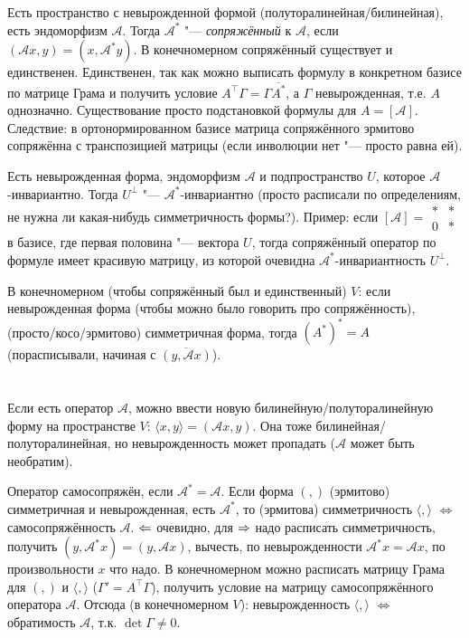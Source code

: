 \section{} %
Есть пространство с невырожденной формой (полуторалинейная/билинейная), есть эндоморфизм $\mathcal{A}$.
Тогда $\mathcal{A}^*$ "--- \textit{сопряжённый} к $\mathcal{A}$, если $(\mathcal{A}x, y) = (x, \mathcal{A}^*y)$.
В конечномерном сопряжённый существует и единственен.
Единственен, так как можно выписать формулу в конкретном базисе по матрице Грама и получить условие $A^\top \Gamma = \Gamma \overline{A^*}$,
а $\Gamma$ невырожденная, т.е. $A$ однозначно.
Существование просто подстановкой формулы для $A=[\mathcal{A}]$.
Следствие: в ортонормированном базисе матрица сопряжённого эрмитово сопряжённа с транспозицией матрицы (если инволюции нет "--- просто равна ей).

Есть невырожденная форма, эндоморфизм $\mathcal{A}$ и подпространство $U$, которое $\mathcal{A}$-инвариантно.
Тогда $U^\bot$ "--- $\mathcal{A}^*$-инвариантно (просто расписали по определениям, \TODO не нужна ли какая-нибудь симметричность формы?).
Пример: если $[\mathcal{A}] = \begin{matrix}*&*\\0&*\end{matrix}$ в базисе, где первая половина "--- вектора $U$,
тогда сопряжённый оператор по формуле имеет красивую матрицу, из которой очевидна $\mathcal{A}^*$-инвариантность $U^\bot$.

В конечномерном (чтобы сопряжённый был и единственный) $V$: если невырожденная форма (чтобы можно было говорить про сопряжённость), (просто/косо/эрмитово) симметричная форма,
тогда $(A^*)^*=A$ (порасписывали, начиная с $\overline{(y, \mathcal{A}x)}$).

\section{} %
Если есть оператор $\mathcal A$, можно ввести новую билинейную/полуторалинейную форму на пространстве $V$: $\langle x, y \rangle = (\mathcal{A}x, y)$.
Она тоже билинейная/полуторалинейная, но невырожденность может пропадать ($\mathcal A$ может быть необратим).

Оператор самосопряжён, если $\mathcal{A}^* = \mathcal{A}$.
Если форма $(,)$ (эрмитово) симметричная и невырожденная, есть $\mathcal A^*$, то (эрмитова) симметричность $\langle , \rangle$ $\iff$ самосопряжённость $\mathcal A$.
$\Leftarrow$ очевидно, для $\Rightarrow$ надо расписать симметричность, получить $(y, \mathcal A^* x) = (y, \mathcal A x)$, вычесть, по невырожденности $\mathcal A^* x = \mathcal A x$, по произвольности $x$ что надо.
В конечномерном можно расписать матрицу Грама для $(,)$ и $\langle , \rangle$ ($\Gamma' = A^\top \Gamma$), получить условие на матрицу самосопряжённого оператора $\mathcal A$.
Отсюда (в конечномерном $V$): невырожденность $\langle , \rangle$ $\iff$ обратимость $\mathcal A$, т.к. $\det \Gamma \ne 0$.

